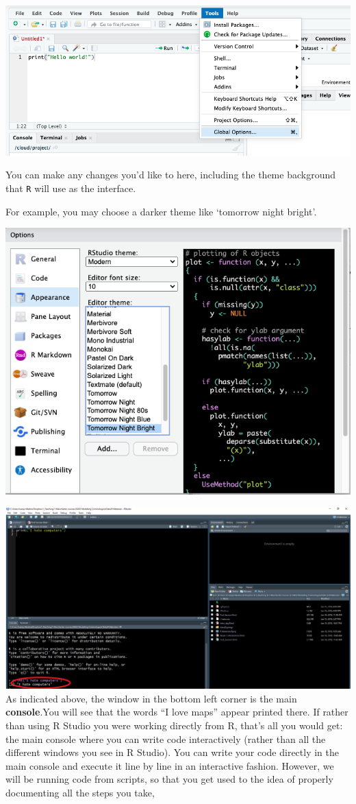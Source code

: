\documentclass[
]{book}
\begin{document}
\includegraphics{img/tools_global_options.png}

You can make any changes you'd like to here, including the theme background that \texttt{R} will use as the interface.

For example, you may choose a darker theme like `tomorrow night bright'.

\includegraphics{img/appearance_choose_tomorrow_night_bright.png}

\includegraphics{img/consoleresults.png}
As indicated above, the window in the bottom left corner is the main \textbf{console}.You will see that the words ``I love maps'' appear printed there. If rather than using R Studio you were working directly from R, that's all you would get: the main console where you can write code interactively (rather than all the different windows you see in R Studio). You can write your code directly in the main console and execute it line by line in an interactive fashion. However, we will be running code from scripts, so that you get used to the idea of properly documenting all the steps you take,
\end{document}
